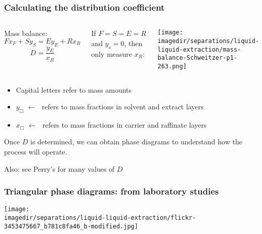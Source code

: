 \begin{frame}\frametitle{Calculating the distribution coefficient {\color{myOrange}{(in the lab only)}}}
	\begin{columns}[t]
			Mass balance:
			\[ F x_F + S y_S = E y_E + R x_R \]
			\[ D = \frac{y_E}{x_R} \]

			\vspace{12pt}
			If $F = S = E = R$ and $y_s = 0$, then only measure $x_R$:

			\begin{center}
				\texttt{[image: \\imagedir/separations/liquid-liquid-extraction/mass-balance-Schweitzer-p1-263.png]}
		
				\vspace{-6pt}
				
				\vspace{-6pt}
			\end{center}
	\end{columns}
	\begin{itemize}
		\item	Capital letters refer to mass amounts
		\item	$y_\Box \,\, \leftarrow\,\,$  refers to mass fractions in solvent and extract layers
		\item	$x_\Box \,\, \leftarrow\,\,$  refers to mass fractions in carrier and raffinate layers
	\end{itemize}
	Once $D$ is determined, we can obtain phase diagrams to understand how the process will operate.

	\vspace{6pt}
	Also: see Perry's for many values of $D$
\end{frame}

\begin{frame}\frametitle{Triangular phase diagrams: from laboratory studies}
	\begin{center}
		\texttt{[image: \\imagedir/separations/liquid-liquid-extraction/flickr-3453475667\_b781c8fa46\_b-modified.jpg]}
	\end{center}
	\vspace{-12pt}
\end{frame}

